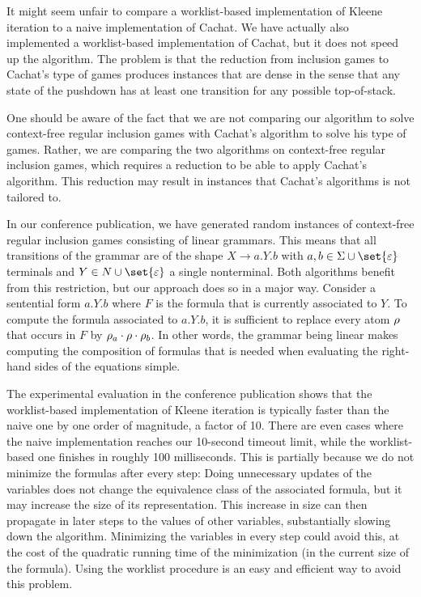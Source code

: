 \documentclass[../../diss.tex]{subfiles}
\begin{document}
It might seem unfair to compare a worklist-based implementation of Kleene iteration to a naive implementation of Cachat.
We have actually also implemented a worklist-based implementation of Cachat, but it does not speed up the algorithm.
The problem is that the reduction from inclusion games to Cachat's type of games produces instances that are dense in the sense that any state of the pushdown has at least one transition for any possible top-of-stack.

One should be aware of the fact that we are not comparing our algorithm to solve context-free regular inclusion games with Cachat's algorithm to solve his type of games.
Rather, we are comparing the two algorithms on context-free regular inclusion games, which requires a reduction to be able to apply Cachat's algorithm.
This reduction may result in instances that Cachat's algorithms is not tailored to.

In our conference publication, we have generated random instances of context-free regular inclusion games consisting of linear grammars.
This means that all transitions of the grammar are of the shape $X \to a.Y.b$ with $a, b \in \Sigma \cup \set{\eps}$ terminals and $Y \in N \cup \set{\eps}$ a single nonterminal.
Both algorithms benefit from this restriction, but our approach does so in a major way.
Consider a sentential form $a.Y.b$ where $F$ is the formula that is currently associated to $Y$.
To compute the formula associated to $a.Y.b$, it is sufficient to replace every atom $\tbox$ that occurs in $F$ by $\tbox{a} \relcomp \tbox \relcomp \tbox{b}$.
In other words, the grammar being linear makes computing the composition of formulas that is needed when evaluating the right-hand sides of the equations simple.

The experimental evaluation in the conference publication shows that the worklist-based implementation of Kleene iteration is typically faster than the naive one by one order of magnitude, \ie a factor of 10.
There are even cases where the naive implementation reaches our 10-second timeout limit, while the worklist-based one finishes in roughly 100 milliseconds.
This is partially because we do not minimize the formulas after every step:
Doing unnecessary updates of the variables does not change the equivalence class of the associated formula, but it may increase the size of its representation.
This increase in size can then propagate in later steps to the values of other variables, substantially slowing down the algorithm.
Minimizing the variables in every step could avoid this, at the cost of the quadratic running time of the minimization (in the current size of the formula).
Using the worklist procedure is an easy and efficient way to avoid this problem.
\end{document}
